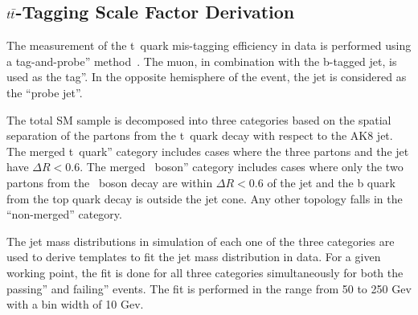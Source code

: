 \begin{itemize}
\end{itemize}
\subsection{$t\bar{t} $-Tagging Scale Factor Derivation \label{ss:ttbarSF}}

The measurement of the t~quark mis-tagging efficiency in data is performed using a tag-and-probe'' method~\cite{Khachatryan:2010xn}. The muon, in combination with the b-tagged jet, is used as
the tag''. In the opposite hemisphere of the event, the jet is
considered as the ``probe jet''.

The total SM  sample is decomposed into three categories based on the spatial separation of the partons from the t~quark decay with respect to the AK8 jet. The merged t~quark'' category includes cases where the three partons and the jet have $\Delta R < 0.6$. The merged \PW~boson'' category includes cases where only the two partons from the \PW~boson decay are within $\Delta R <0.6$ of the jet and the b quark from the top quark decay is outside the jet
cone. Any other topology falls in the ``non-merged'' category. 

The jet mass distributions in simulation of each one of the three categories are used to derive templates to fit the jet mass distribution in data. For a given working point, the fit is done for all three categories simultaneously for both the passing'' and failing'' events. The fit is performed in the range from 50 to 250 Gev with a bin width of 10 Gev. 
 
